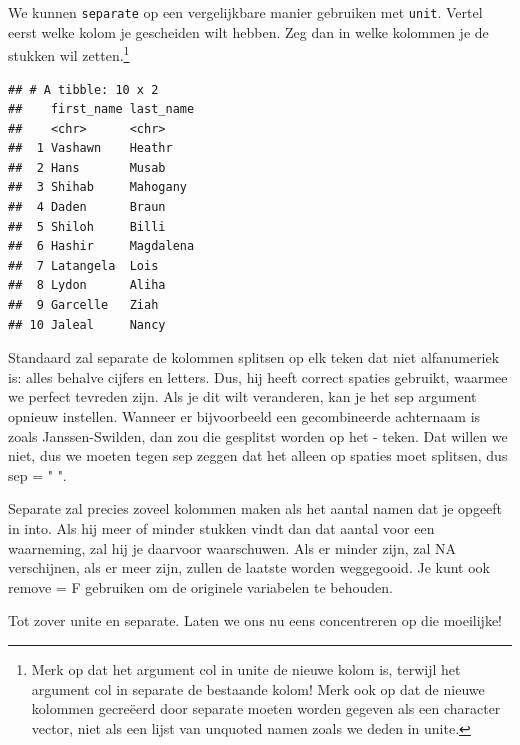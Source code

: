 \documentclass[]{tufte-book}
\newenvironment{Shaded}{}{}
\newcommand{\DataTypeTok}[1]{\textcolor[rgb]{0.56,0.13,0.00}{#1}}
\newcommand{\DecValTok}[1]{\textcolor[rgb]{0.25,0.63,0.44}{#1}}
\newcommand{\KeywordTok}[1]{\textcolor[rgb]{0.00,0.44,0.13}{\textbf{#1}}}
\newcommand{\NormalTok}[1]{#1}
\newcommand{\OperatorTok}[1]{\textcolor[rgb]{0.40,0.40,0.40}{#1}}
\newcommand{\StringTok}[1]{\textcolor[rgb]{0.25,0.44,0.63}{#1}}
\begin{document}
We kunnen \texttt{separate} op een vergelijkbare manier gebruiken met \texttt{unit}. Vertel eerst welke kolom je gescheiden wilt hebben. Zeg dan in welke kolommen je de stukken wil zetten.\footnote{Merk op dat het argument col in unite de nieuwe kolom is, terwijl het argument col in separate de bestaande kolom! Merk ook op dat de nieuwe kolommen gecreëerd door separate moeten worden gegeven als een character vector, niet als een lijst van unquoted namen zoals we deden in unite.}

\begin{Shaded}
\end{Shaded}

\begin{verbatim}
## # A tibble: 10 x 2
##    first_name last_name
##    <chr>      <chr>    
##  1 Vashawn    Heathr   
##  2 Hans       Musab    
##  3 Shihab     Mahogany 
##  4 Daden      Braun    
##  5 Shiloh     Billi    
##  6 Hashir     Magdalena
##  7 Latangela  Lois     
##  8 Lydon      Aliha    
##  9 Garcelle   Ziah     
## 10 Jaleal     Nancy
\end{verbatim}

Standaard zal separate de kolommen splitsen op elk teken dat niet alfanumeriek is: alles behalve cijfers en letters. Dus, hij heeft correct spaties gebruikt, waarmee we perfect tevreden zijn. Als je dit wilt veranderen, kan je het sep argument opnieuw instellen. Wanneer er bijvoorbeeld een gecombineerde achternaam is zoals Janssen-Swilden, dan zou die gesplitst worden op het - teken. Dat willen we niet, dus we moeten tegen sep zeggen dat het alleen op spaties moet splitsen, dus sep = " ".

Separate zal precies zoveel kolommen maken als het aantal namen dat je opgeeft in into. Als hij meer of minder stukken vindt dan dat aantal voor een waarneming, zal hij je daarvoor waarschuwen. Als er minder zijn, zal NA verschijnen, als er meer zijn, zullen de laatste worden weggegooid. Je kunt ook remove = F gebruiken om de originele variabelen te behouden.

Tot zover unite en separate. Laten we ons nu eens concentreren op die moeilijke!
\end{document}
